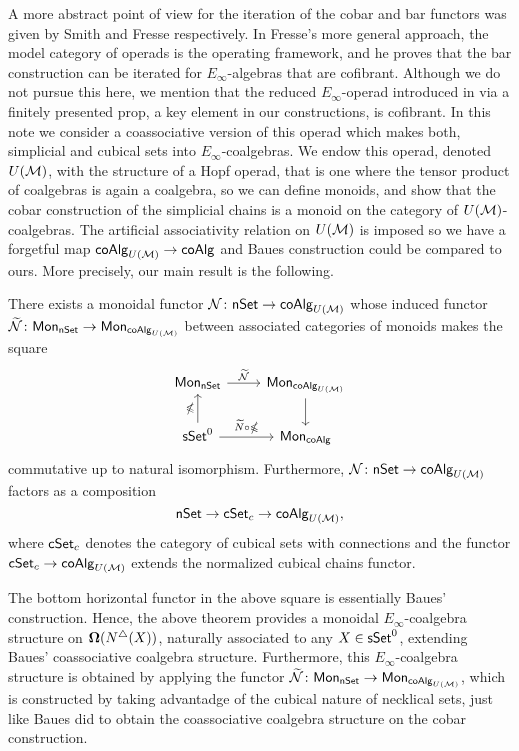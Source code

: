 A more abstract point of view for the iteration of the cobar and bar functors was given by Smith \cite{Smith94cobar} and Fresse \cite{Fresse10complex} respectively. 
In Fresse's more general approach, the model category of operads is the operating framework, and he proves that the bar construction can be iterated for $E_\infty$-algebras that are cofibrant. Although we do not pursue this here, we mention that the reduced $E_\infty$-operad introduced in \cite{Medina20prop1} via a finitely presented prop, a key element in our constructions, is cofibrant.
In this note we consider a coassociative version of this operad which makes both, simplicial and cubical sets into $E_\infty$-coalgebras.
We endow this operad, denoted $U(\mathcal{M})$, with the structure of a Hopf operad, that is one where the tensor product of coalgebras is again a coalgebra, so we can define monoids, and show that the cobar construction of the simplicial chains is a monoid on the category of $U(\mathcal{M})$-coalgebras.
The artificial associativity relation on $U(\mathcal{M})$ is imposed so we have a forgetful map $\mathsf{coAlg}_{U(\mathcal{M})} \to \mathsf{coAlg}$ and Baues construction could be compared to ours. More precisely, our main result is the following.

\begin{theorem}
There exists a monoidal functor $\mathcal{N} \colon \mathsf{nSet} \to \mathsf{coAlg}_{U(\mathcal{M})}$ whose induced functor $\widetilde{\mathcal{N}} \colon \mathsf{Mon}_{\mathsf{nSet}} \to \mathsf{Mon}_{\mathsf{coAlg}_{U(\mathcal{M})}}$ between associated categories of monoids makes the square
\begin{equation*}
\begin{tikzcd}
\Mon_{\nSet} \arrow[r, "\widetilde{\mathcal{N}}"] & \Mon_{\coAlg_{U(\M)}} \arrow[d]\\
\sSet^0 \arrow[r, "\widetilde{N} \circ \gcobar"] \arrow[u, "\gcobar"] & \Mon_{\coAlg}
\end{tikzcd}
\end{equation*}
commutative up to natural isomorphism. Furthermore, $\mathcal{N} \colon \mathsf{nSet} \to \mathsf{coAlg}_{U(\mathcal{M})}$ factors as a composition $$\mathsf{nSet} \to \mathsf{cSet}_c \to \mathsf{coAlg}_{U(\mathcal{M})},$$ where $\mathsf{cSet}_c$ denotes the category of cubical sets with connections and the functor $\mathsf{cSet}_c \to \mathsf{coAlg}_{U(\mathcal{M})}$ extends the normalized cubical chains functor. 
\end{theorem} 

The bottom horizontal functor in the above square is essentially Baues' construction. Hence, the above theorem provides a monoidal $E_{\infty}$-coalgebra structure on $\mathbf{\Omega}(N^{\triangle} (X))$, naturally associated to any $X \in \mathsf{sSet}^0$, extending Baues' coassociative coalgebra structure. Furthermore, this $E_{\infty}$-coalgebra structure is obtained by applying the functor $\widetilde{\mathcal{N}} \colon \mathsf{Mon}_{\mathsf{nSet}} \to \mathsf{Mon}_{\mathsf{coAlg}_{U(\mathcal{M})}}$, which is constructed by taking advantadge of the cubical nature of necklical sets, just like Baues did to obtain the coassociative coalgebra structure on the cobar construction. 

